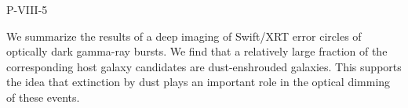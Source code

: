 P-VIII-5


\bigskip



\bigskip

\noindent We summarize the results of a deep 
imaging of Swift/XRT error circles 
of optically dark gamma-ray bursts.
We find that a relatively large fraction of the corresponding host galaxy candidates are dust-enshrouded galaxies. This supports the idea that extinction by dust plays an important role in the 
optical dimming of these events.
